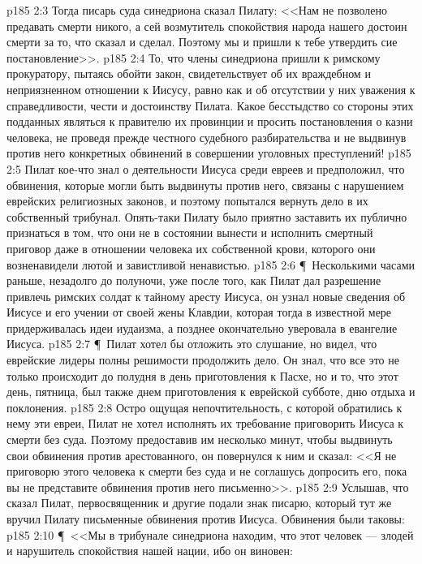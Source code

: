 \vs p185 2:3 Тогда писарь суда синедриона сказал Пилату: <<Нам не позволено предавать смерти никого, а сей возмутитель спокойствия народа нашего достоин смерти за то, что сказал и сделал. Поэтому мы и пришли к тебе утвердить сие постановление>>.
\vs p185 2:4 То, что члены синедриона пришли к римскому прокуратору, пытаясь обойти закон, свидетельствует об их враждебном и неприязненном отношении к Иисусу, равно как и об отсутствии у них уважения к справедливости, чести и достоинству Пилата. Какое бесстыдство со стороны этих подданных являться к правителю их провинции и просить постановления о казни человека, не проведя прежде честного судебного разбирательства и не выдвинув против него конкретных обвинений в совершении уголовных преступлений!
\vs p185 2:5 Пилат кое\hyp{}что знал о деятельности Иисуса среди евреев и предположил, что обвинения, которые могли быть выдвинуты против него, связаны с нарушением еврейских религиозных законов, и поэтому попытался вернуть дело в их собственный трибунал. Опять\hyp{}таки Пилату было приятно заставить их публично признаться в том, что они не в состоянии вынести и исполнить смертный приговор даже в отношении человека их собственной крови, которого они возненавидели лютой и завистливой ненавистью.
\vs p185 2:6 \P\ Несколькими часами раньше, незадолго до полуночи, уже после того, как Пилат дал разрешение привлечь римских солдат к тайному аресту Иисуса, он узнал новые сведения об Иисусе и его учении от своей жены Клавдии, которая тогда в известной мере придерживалась идеи иудаизма, а позднее окончательно уверовала в евангелие Иисуса.
\vs p185 2:7 \P\ Пилат хотел бы отложить это слушание, но видел, что еврейские лидеры полны решимости продолжить дело. Он знал, что все это не только происходит до полудня в день приготовления к Пасхе, но и то, что этот день, пятница, был также днем приготовления к еврейской субботе, дню отдыха и поклонения.
\vs p185 2:8 Остро ощущая непочтительность, с которой обратились к нему эти евреи, Пилат не хотел исполнять их требование приговорить Иисуса к смерти без суда. Поэтому предоставив им несколько минут, чтобы выдвинуть свои обвинения против арестованного, он повернулся к ним и сказал: <<Я не приговорю этого человека к смерти без суда и не соглашусь допросить его, пока вы не представите обвинения против него письменно>>.
\vs p185 2:9 Услышав, что сказал Пилат, первосвященник и другие подали знак писарю, который тут же вручил Пилату письменные обвинения против Иисуса. Обвинения были таковы:
\vs p185 2:10 \P\ <<Мы в трибунале синедриона находим, что этот человек --- злодей и нарушитель спокойствия нашей нации, ибо он виновен:
